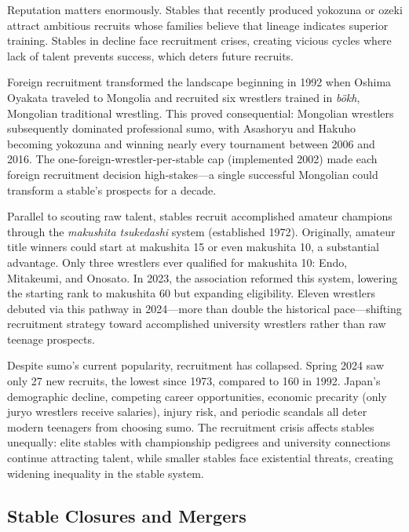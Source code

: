 Reputation matters enormously. Stables that recently produced yokozuna or ozeki attract ambitious recruits whose families believe that lineage indicates superior training. Stables in decline face recruitment crises, creating vicious cycles where lack of talent prevents success, which deters future recruits.

Foreign recruitment transformed the landscape beginning in 1992 when Oshima Oyakata traveled to Mongolia and recruited six wrestlers trained in \textit{bökh}, Mongolian traditional wrestling.\cite{diplomat2020mongolia} This proved consequential: Mongolian wrestlers subsequently dominated professional sumo, with Asashoryu and Hakuho becoming yokozuna and winning nearly every tournament between 2006 and 2016. The one-foreign-wrestler-per-stable cap (implemented 2002) made each foreign recruitment decision high-stakes—a single successful Mongolian could transform a stable's prospects for a decade.

Parallel to scouting raw talent, stables recruit accomplished amateur champions through the \textit{makushita tsukedashi} system (established 1972). Originally, amateur title winners could start at makushita 15 or even makushita 10, a substantial advantage. Only three wrestlers ever qualified for makushita 10: Endo, Mitakeumi, and Onosato.\cite{jasumo2024tsukedashi} In 2023, the association reformed this system, lowering the starting rank to makushita 60 but expanding eligibility.\cite{tachiai2023reforms} Eleven wrestlers debuted via this pathway in 2024—more than double the historical pace—shifting recruitment strategy toward accomplished university wrestlers rather than raw teenage prospects.

Despite sumo's current popularity, recruitment has collapsed. Spring 2024 saw only 27 new recruits, the lowest since 1973, compared to 160 in 1992.\cite{japantimes2024recruitment} Japan's demographic decline, competing career opportunities, economic precarity (only juryo wrestlers receive salaries), injury risk, and periodic scandals all deter modern teenagers from choosing sumo. The recruitment crisis affects stables unequally: elite stables with championship pedigrees and university connections continue attracting talent, while smaller stables face existential threats, creating widening inequality in the stable system.

\subsection{Stable Closures and Mergers}

